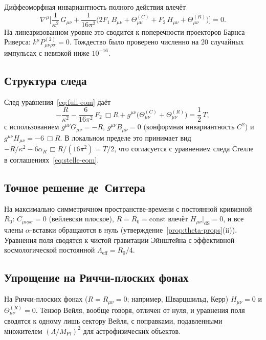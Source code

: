 \documentclass[12pt,a4paper]{article}
\newcommand{\Lam}{\Lambda}
\theoremstyle{plain}
\theoremstyle{definition}
\begin{document}
Диффеоморфная инвариантность полного действия влечёт
\begin{equation}\label{eq:bianchi}
  \nabla^\mu\biggl[\frac{1}{\kappa^2}\,G_{\mu\nu}
  + \frac{1}{16\pi^2}\bigl(2F_1\,B_{\mu\nu}
  + \Theta^{(C)}_{\mu\nu}
  + F_2\,H_{\mu\nu}
  + \Theta^{(R)}_{\mu\nu}\bigr)\biggr] = 0.
\end{equation}
На линеаризованном уровне это сводится к поперечности проекторов
Барнса--Риверса: $k^\mu P^{(2)}_{\mu\nu\rho\sigma} = 0$.
Тождество было проверено численно на 20 случайных импульсах с невязкой
ниже $10^{-16}$.

\subsection{Структура следа}

След уравнения~\eqref{eq:full-eom} даёт
\begin{equation}\label{eq:trace}
  -\frac{R}{\kappa^2}
  - \frac{6}{16\pi^2}\,F_2\,\Box R
  + g^{\mu\nu}\bigl(\Theta^{(C)}_{\mu\nu}
  + \Theta^{(R)}_{\mu\nu}\bigr)
  = \frac{1}{2}\,T,
\end{equation}
с использованием $g^{\mu\nu}G_{\mu\nu} = -R$, $g^{\mu\nu}B_{\mu\nu} = 0$
(конформная инвариантность $C^2$) и
$g^{\mu\nu}H_{\mu\nu} = -6\,\Box R$.  В локальном пределе это
принимает вид $-R/\kappa^2 - 6\alpha_R\,\Box R/(16\pi^2) = T/2$,
что согласуется с уравнением следа
Стелле~\cite{Stelle:1976gc} в соглашениях~\eqref{eq:stelle-eom}.

\subsection{Точное решение де~Ситтера}

На максимально симметричном пространстве-времени с постоянной кривизной
$R_0$: $C_{\mu\nu\rho\sigma} = 0$ (вейлевски плоское),
$R = R_0 = \mathrm{const}$ влечёт $H_{\mu\nu}|_{\mathrm{dS}} = 0$,
и все члены $\alpha$-вставки обращаются в нуль
(утверждение~\ref{prop:theta-props}(ii)).  Уравнения поля сводятся к
чистой гравитации Эйнштейна с эффективной космологической постоянной
$\Lam_{\mathrm{eff}} = R_0/4$.

\subsection{Упрощение на Риччи-плоских фонах}

На Риччи-плоских фонах ($R = R_{\mu\nu} = 0$; например, Шварцшильд, Керр)
$H_{\mu\nu} = 0$ и $\Theta^{(R)}_{\mu\nu} = 0$.  Тензор Вейля, вообще
говоря, отличен от нуля, и уравнения поля сводятся к одному лишь сектору
Вейля, с поправками, подавленными множителем
$(\Lam/M_{\mathrm{Pl}})^2$ для астрофизических объектов.
\end{document}
